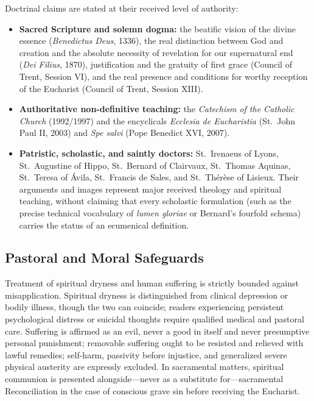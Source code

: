 Doctrinal claims are stated at their received level of authority:
\begin{itemize}
\item \textbf{Sacred Scripture and solemn dogma:} the beatific vision of the divine essence (\emph{Benedictus Deus}, 1336), the real distinction between God and creation and the absolute necessity of revelation for our supernatural end (\emph{Dei Filius}, 1870), justification and the gratuity of first grace (Council of Trent, Session VI), and the real presence and conditions for worthy reception of the Eucharist (Council of Trent, Session XIII).
\item \textbf{Authoritative non-definitive teaching:} the \emph{Catechism of the Catholic Church} (1992/1997) and the encyclicals \emph{Ecclesia de Eucharistia} (St.\ John Paul II, 2003) and \emph{Spe salvi} (Pope Benedict XVI, 2007).
\item \textbf{Patristic, scholastic, and saintly doctors:} St.\ Irenaeus of Lyons, St.\ Augustine of Hippo, St.\ Bernard of Clairvaux, St.\ Thomas Aquinas, St.\ Teresa of Ávila, St.\ Francis de Sales, and St.\ Th\'er\`ese of Lisieux. Their arguments and images represent major received theology and spiritual teaching, without claiming that every scholastic formulation (such as the precise technical vocabulary of \emph{lumen gloriae} or Bernard's fourfold schema) carries the status of an ecumenical definition.
\end{itemize}

\subsection*{Pastoral and Moral Safeguards}

Treatment of spiritual dryness and human suffering is strictly bounded against misapplication. Spiritual dryness is distinguished from clinical depression or bodily illness, though the two can coincide; readers experiencing persistent psychological distress or suicidal thoughts require qualified medical and pastoral care. Suffering is affirmed as an evil, never a good in itself and never presumptive personal punishment; removable suffering ought to be resisted and relieved with lawful remedies; self-harm, passivity before injustice, and generalized severe physical austerity are expressly excluded. In sacramental matters, spiritual communion is presented alongside---never as a substitute for---sacramental Reconciliation in the case of conscious grave sin before receiving the Eucharist.

